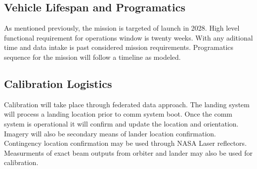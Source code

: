 \subsection{Vehicle Lifespan and Programatics}
    As mentioned previously, the mission is targeted of launch in 2028. High level functional requirement for operations window is twenty weeks. With any aditional time and data intake is past considered mission requirements. Programatics sequence for the mission will follow a timeline as modeled. 

\subsection{Calibration Logistics}
Calibration will take place through federated data approach. The landing system will process a landing location prior to comm system boot. Once the comm system is operational it will confirm and update the location and orientation. Imagery will also be secondary means of lander location confirmation. Contingency location confirmation may be used through NASA Laser reflectors. Measurments of exact beam outputs from orbiter and lander may also be used for calibration. 